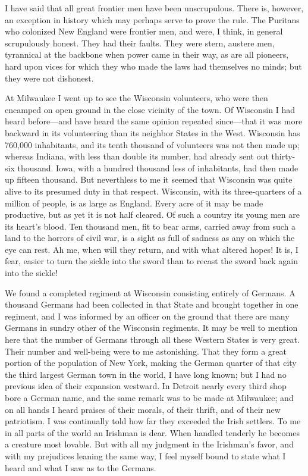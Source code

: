 I have said that all great frontier men have been unscrupulous.
There is, however, an exception in history which may perhaps serve
to prove the rule.  The Puritans who colonized New England were
frontier men, and were, I think, in general scrupulously honest.
They had their faults.  They were stern, austere men, tyrannical at
the backbone when power came in their way, as are all pioneers,
hard upon vices for which they who made the laws had themselves no
minds; but they were not dishonest.

At Milwaukee I went up to see the Wisconsin volunteers, who were
then encamped on open ground in the close vicinity of the town.  Of
Wisconsin I had heard before---and have heard the same opinion
repeated since---that it was more backward in its volunteering than
its neighbor States in the West.  Wisconsin has 760,000
inhabitants, and its tenth thousand of volunteers was not then made
up; whereas Indiana, with less than double its number, had already
sent out thirty-six thousand.  Iowa, with a hundred thousand less
of inhabitants, had then made up fifteen thousand.  But neverthless
to me it seemed that Wisconsin was quite alive to its presumed duty
in that respect.  Wisconsin, with its three-quarters of a million
of people, is as large as England.  Every acre of it may be made
productive, but as yet it is not half cleared.  Of such a country
its young men are its heart's blood.  Ten thousand men, fit to bear
arms, carried away from such a land to the horrors of civil war, is
a sight as full of sadness as any on which the eye can rest.  Ah
me, when will they return, and with what altered hopes!  It is, I
fear, easier to turn the sickle into the sword than to recast the
sword back again into the sickle!

We found a completed regiment at Wisconsin consisting entirely of
Germans.  A thousand Germans had been collected in that State and
brought together in one regiment, and I was informed by an officer
on the ground that there are many Germans in sundry other of the
Wisconsin regiments.  It may be well to mention here that the
number of Germans through all these Western States is very great.
Their number and well-being were to me astonishing.  That they form
a great portion of the population of New York, making the German
quarter of that city the third largest German town in the world, I
have long known; but I had no previous idea of their expansion
westward.  In Detroit nearly every third shop bore a German name,
and the same remark was to be made at Milwaukee; and on all hands I
heard praises of their morals, of their thrift, and of their new
patriotism.  I was continually told how far they exceeded the Irish
settlers.  To me in all parts of the world an Irishman is dear.
When handled tenderly he becomes a creature most lovable.  But with
all my judgment in the Irishman's favor, and with my prejudices
leaning the same way, I feel myself bound to state what I heard and
what I saw as to the Germans.

